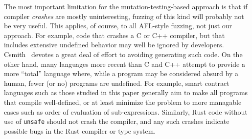 The most important limitation for the mutation-testing-based approach is that if compiler \emph{crashes} are mostly uninteresting, fuzzing of this kind will probably not be very useful.  This applies, of course, to all AFL-style fuzzing, not just our approach.  For example, code that crashes a C or C++ compiler, but that includes extensive undefined behavior may well be ignored by developers.  Csmith~\cite{csmith} devotes a great deal of effort to avoiding generating such code.  On the other hand, many languages more recent than C and C++ attempt to provide a more ``total'' language where, while a program may be considered absurd by a human, fewer (or no) programs are undefined.  For example, smart contract languages such as those studied in this paper generally aim to make all programs that compile well-defined, or at least minimize the problem to more managable cases such as order of evaluation of sub-expressions.  Similarly, Rust code without use of {\tt unsafe} should not crash the compiler, and any such crashes indicate possible bugs in the Rust compiler or type system.  